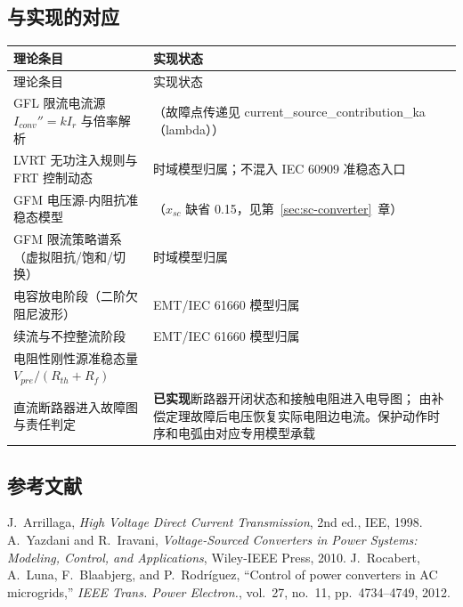 \subsection{与实现的对应}
\begin{center}\footnotesize
\begin{longtable}{@{}L{6.8cm}L{8.6cm}@{}}
\toprule
理论条目 & 实现状态\\
\midrule
\endfirsthead
\toprule
理论条目 & 实现状态\\
\midrule
\endhead
GFL 限流电流源 $I_{conv}''=kI_r$ 与倍率解析 &
（故障点传递见 current\_source\_contribution\_ka（lambda））\\
LVRT 无功注入规则与 FRT 控制动态 &  时域模型归属；不混入 IEC 60909 准稳态入口\\
GFM 电压源-内阻抗准稳态模型 &
（$x_{sc}$ 缺省 0.15，见第~\ref{sec:sc-converter}~章）\\
GFM 限流策略谱系（虚拟阻抗/饱和/切换） &  时域模型归属\\
电容放电阶段（二阶欠阻尼波形） & EMT/IEC 61660 模型归属\\
续流与不控整流阶段 & EMT/IEC 61660 模型归属\\
电阻性刚性源准稳态量 $V_{pre}/(R_{th}{+}R_f)$ &
\\
直流断路器进入故障图与责任判定 &
\textbf{已实现}\quad 断路器开闭状态和接触电阻进入电导图； 由补偿定理故障后电压恢复实际电阻边电流。保护动作时序和电弧由对应专用模型承载\\
\bottomrule
\end{longtable}
\end{center}

\subsection{参考文献}
{\renewcommand{\section}[2]{}%
\begin{thebibliography}{9}\small
{} J.~Arrillaga, \emph{High Voltage Direct Current
Transmission}, 2nd ed., IEE, 1998.
 A.~Yazdani and R.~Iravani, \emph{Voltage-Sourced Converters
in Power Systems: Modeling, Control, and Applications}, Wiley-IEEE Press, 2010.
 J.~Rocabert, A.~Luna, F.~Blaabjerg, and P.~Rodr\'iguez,
``Control of power converters in AC microgrids,'' \emph{IEEE Trans. Power Electron.},
vol.~27, no.~11, pp.~4734--4749, 2012.
\end{thebibliography}}

